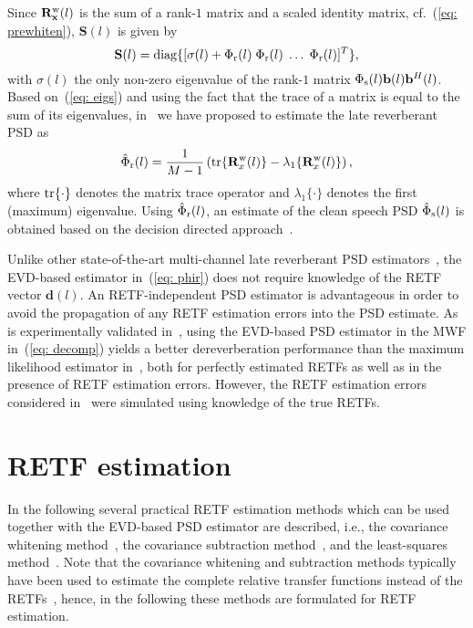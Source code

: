\documentclass{article}
\begin{document}
Since $\mathbf{R}^{\rm w}_{\mathbf{x}}(l)$ is the sum of a rank-$1$ matrix and a scaled identity matrix, cf.~(\ref{eq: prewhiten}), $\mathbf{S}(l)$ is given by
\begin{equation}
  \label{eq: eigs}
  \mathbf{S}(l) = {\rm diag} \{[\sigma(l) + \Phi_{\rm r}(l) \; \Phi_{\rm r}(l) \; \ldots \; \Phi_{\rm r}(l)]^T \},
\end{equation}
with $\sigma(l)$ the only non-zero eigenvalue of the rank-$1$ matrix $\Phi_{\rm s}(l) \mathbf{b}(l) \mathbf{b}^H(l)$.
Based on~(\ref{eq: eigs}) and using the fact that the trace of a matrix is equal to the sum of its eigenvalues, in~\cite{Kodrasi_ICASSP_2017} we have proposed to estimate the late reverberant PSD as
\begin{equation}
  \label{eq: phir}
  \hat{\Phi}_{\rm r}(l) = \frac{1}{M-1} \left( {\rm tr} \{\mathbf{R}^{\rm w}_{x}(l) \} - \lambda_{1}\{\mathbf{R}^{\rm w}_{x}(l) \} \right),
\end{equation}
where ${\rm tr} \{ \cdot \}$ denotes the matrix trace operator and $\lambda_{1} \{ \cdot \}$ denotes the first (maximum) eigenvalue.
Using $\hat{\Phi}_{\rm r}(l)$, an estimate of the clean speech PSD $\hat{\Phi}_{\rm s}(l)$ is obtained based on the decision directed approach~\cite{Ephraim_ITASSP_1985}.

Unlike other state-of-the-art multi-channel late reverberant PSD estimators~\cite{Braun_EUSIPCO_2013,Kuklasinski_EUSIPCO_2014g,Braun_EURASIP_2015,Schwartz_WASPAA_2015,Schwartz_ICASSP_2016,Kuklasinski_ITASLP_2016}, the EVD-based estimator in~(\ref{eq: phir}) does not require knowledge of the RETF vector $\mathbf{d}(l)$.
An RETF-independent PSD estimator is advantageous in order to avoid the propagation of any RETF estimation errors into the PSD estimate.
As is experimentally validated in~\cite{Kodrasi_ICASSP_2017}, using the EVD-based PSD estimator in the MWF in~(\ref{eq: decomp}) yields a better dereverberation performance than the maximum likelihood estimator in~\cite{Kuklasinski_EUSIPCO_2014g}, both for perfectly estimated RETFs as well as in the presence of RETF estimation errors.
However, the RETF estimation errors considered in~\cite{Kodrasi_ICASSP_2017} were simulated using knowledge of the true RETFs.

\section{RETF estimation}
\label{sec: retf_est}
In the following several practical RETF estimation methods which can be used together with the EVD-based PSD estimator are described, i.e., the covariance whitening method~\cite{Golan_ITASLP_2009,Golan_ICASSP_2015}, the covariance subtraction method~\cite{Cohen_ITSAP_2004,Golan_ICASSP_2015}, and the least-squares method~\cite{OSchwartz_ITASLP_2015}.
Note that the covariance whitening and subtraction methods typically have been used to estimate the complete relative transfer functions instead of the RETFs~\cite{Golan_ICASSP_2015}, hence, in the following these methods are formulated for RETF estimation.
\end{document}
